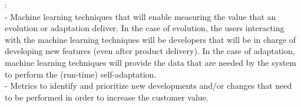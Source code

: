 \documentclass[12pt]{article}
\newcommand{\ugh}[1]{\textcolor{red}{\uwave{#1}}} %
\newcommand{\nb}[2]{
    \fcolorbox{gray}{yellow}{\bfseries\sffamily\scriptsize#1}
    {\sf\small$\blacktriangleright$\textit{#2}$\blacktriangleleft$}
   }
\newcommand{\ugh}[1]{#1} %
\newcommand{\nb}[2]{}
\newcommand\ivica[1]{\nb{Ivica}{#1}}
\begin{document}
:\\
 - Machine learning techniques that will enable measuring the value that an evolution or adaptation deliver. In the case of evolution, the users interacting with the machine learning techniques will be developers that will be in charge of developing new features (even after product delivery). In the case of adaptation, machine learning techniques will provide the data that are needed by the system to perform the (run-time) self-adaptation. \\ 
 - Metrics to identify and prioritize new developments and/or changes that need to be performed in order to increase the customer value.

\vspace{.2cm}
\end{document}
